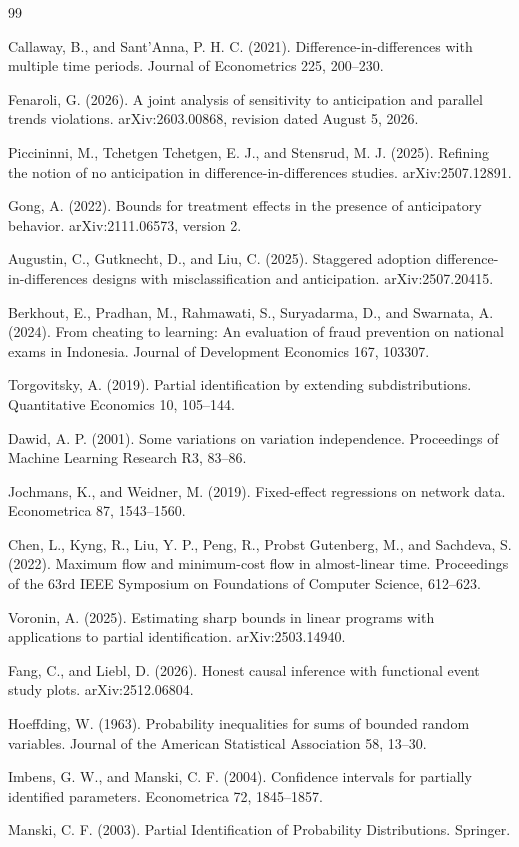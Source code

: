 \documentclass{article}
\begin{document}
\begin{thebibliography}{99}

   Callaway, B., and Sant'Anna, P. H. C. (2021). Difference-in-differences with multiple time periods. Journal of Econometrics 225, 200--230.

   Fenaroli, G. (2026). A joint analysis of sensitivity to anticipation and parallel trends violations. arXiv:2603.00868, revision dated August 5, 2026.

   Piccininni, M., Tchetgen Tchetgen, E. J., and Stensrud, M. J. (2025). Refining the notion of no anticipation in difference-in-differences studies. arXiv:2507.12891.

   Gong, A. (2022). Bounds for treatment effects in the presence of anticipatory behavior. arXiv:2111.06573, version 2.

   Augustin, C., Gutknecht, D., and Liu, C. (2025). Staggered adoption difference-in-differences designs with misclassification and anticipation. arXiv:2507.20415.

   Berkhout, E., Pradhan, M., Rahmawati, S., Suryadarma, D., and Swarnata, A. (2024). From cheating to learning: An evaluation of fraud prevention on national exams in Indonesia. Journal of Development Economics 167, 103307.

   Torgovitsky, A. (2019). Partial identification by extending subdistributions. Quantitative Economics 10, 105--144.

   Dawid, A. P. (2001). Some variations on variation independence. Proceedings of Machine Learning Research R3, 83--86.

   Jochmans, K., and Weidner, M. (2019). Fixed-effect regressions on network data. Econometrica 87, 1543--1560.

   Chen, L., Kyng, R., Liu, Y. P., Peng, R., Probst Gutenberg, M., and Sachdeva, S. (2022). Maximum flow and minimum-cost flow in almost-linear time. Proceedings of the 63rd IEEE Symposium on Foundations of Computer Science, 612--623.

   Voronin, A. (2025). Estimating sharp bounds in linear programs with applications to partial identification. arXiv:2503.14940.

   Fang, C., and Liebl, D. (2026). Honest causal inference with functional event study plots. arXiv:2512.06804.

   Hoeffding, W. (1963). Probability inequalities for sums of bounded random variables. Journal of the American Statistical Association 58, 13--30.

   Imbens, G. W., and Manski, C. F. (2004). Confidence intervals for partially identified parameters. Econometrica 72, 1845--1857.

   Manski, C. F. (2003). Partial Identification of Probability Distributions. Springer.

\end{thebibliography}
\end{document}
